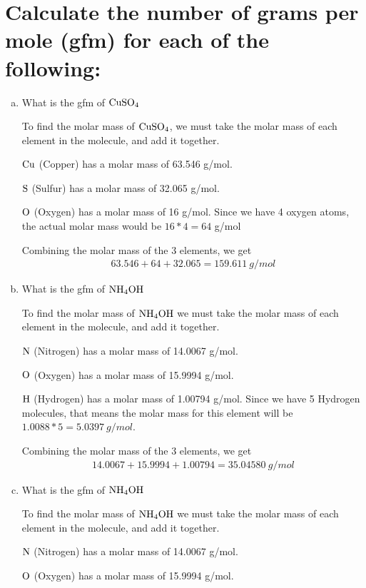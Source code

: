 \documentclass[11pt]{article}
\begin{document}
\section{Calculate the number of grams per mole (gfm) for each of the following:}
\label{sec:org23834dc}
\begin{enumerate}[(a)]
\item What is the gfm of \(\ce{CuSO4}\)

To find the molar mass of \(\ce{CuSO4}\), we must take the molar mass of
each element in the molecule, and add it together.

\(\ce{Cu}\) (Copper) has a molar mass of 63.546 g/mol.

\(\ce{S}\) (Sulfur) has a molar mass of 32.065 g/mol.

\(\ce{O}\) (Oxygen) has a molar mass of 16 g/mol. Since we have 4 oxygen
atoms, the actual molar mass would be \(16*4=64\) g/mol

Combining the molar mass of the 3 elements, we get
\begin{align*}
63.546+64+32.065=159.611\ g/mol
\end{align*}

\item What is the gfm of \(\ce{NH4OH}\)

To find the molar mass of \(\ce{NH4OH}\) we must take the molar mass of each element in the molecule, and add it together.

\(\ce{N}\) (Nitrogen) has a molar mass of 14.0067 g/mol.

\(\ce{O}\) (Oxygen) has a molar mass of 15.9994 g/mol.

\(\ce{H}\) (Hydrogen) has a molar mass of 1.00794 g/mol. Since we have 5
Hydrogen molecules, that means the molar mass for this element will be
\(1.0088*5=5.0397\ g/mol\).

Combining the molar mass of the 3 elements, we get
\begin{align*}
14.0067+15.9994+1.00794=35.04580\ g/mol
\end{align*}

\item What is the gfm of \(\ce{NH4OH}\)

To find the molar mass of \(\ce{NH4OH}\) we must take the molar mass of each element in the molecule, and add it together.

\(\ce{N}\) (Nitrogen) has a molar mass of 14.0067 g/mol.

\(\ce{O}\) (Oxygen) has a molar mass of 15.9994 g/mol.


\end{enumerate}
\end{document}
